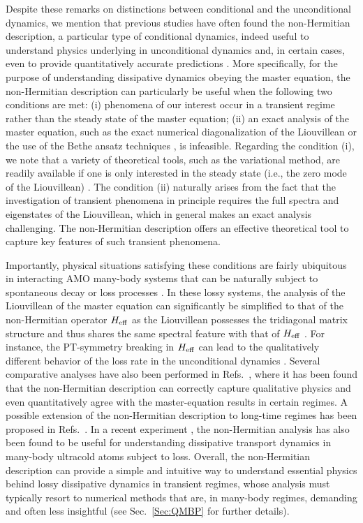 \documentclass{tADP2e}
\theoremstyle{plain}
\theoremstyle{plain}
\theoremstyle{definition}
\begin{document}
Despite these remarks on distinctions between conditional and the unconditional dynamics, we mention that previous studies have often found the non-Hermitian description, a particular type of conditional dynamics, indeed useful to understand physics underlying in unconditional dynamics and, in certain cases, even to provide quantitatively accurate predictions \cite{DAJ09,DAJ14,KW16,LM19,LC19,LDA19}. 
More specifically, for the purpose of understanding dissipative dynamics obeying the master equation, the non-Hermitian description can particularly be useful when the following two conditions are met: (i) phenomena of our interest occur in a transient regime rather than the steady state of the master equation;
(ii) an exact analysis of the master equation, such as the exact numerical diagonalization of the Liouvillean or the use of the Bethe ansatz techniques \cite{Prosen_2015}, is infeasible. 
Regarding the condition (i), we note that a variety of theoretical tools, such as the variational method, are readily available if one is only interested in the steady state (i.e., the zero mode of the Liouvillean)  \cite{WH19}. The condition (ii) naturally arises from the fact that the investigation of transient phenomena in principle requires the full spectra and eigenstates of the Liouvillean, which in general makes an exact analysis  challenging. The non-Hermitian description offers an effective theoretical tool to capture key features of such transient phenomena.

Importantly, physical situations satisfying these conditions are fairly ubiquitous in interacting AMO many-body systems that can be naturally subject to spontaneous decay or loss processes \cite{NS08,RMS09,YB13,ZB14,EU15,PYS15,TT17}. In these lossy systems, the analysis of the Liouvillean of the master equation can significantly be simplified to that of the non-Hermitian operator $H_{\rm eff}$ as the Liouvillean possesses the tridiagonal matrix structure and thus shares the same spectral feature with that of $H_{\rm eff}$ \cite{BHJ93,TJM14}. For instance, the PT-symmetry breaking in $H_{\rm eff}$ can lead to the qualitatively different behavior of the loss rate in the unconditional dynamics \cite{YT20}.   Several comparative analyses have also been performed in Refs.~\cite{Faisal_1981,Graefe_2010,KGZ14,ABJ20,CCL20}, where it has been found that the non-Hermitian description can correctly capture qualitative physics and even quantitatively agree  with the master-equation results in certain regimes. A possible extension of the non-Hermitian description to long-time regimes has been proposed in Refs.~\cite{EA18,Varguet_2019,CCL20}.
In a recent experiment \cite{LM19,CL19}, the non-Hermitian analysis has also been found to be useful for understanding dissipative transport dynamics in many-body ultracold atoms subject to loss. Overall, the non-Hermitian description can provide a simple and intuitive way to understand essential physics behind lossy dissipative dynamics in transient regimes, whose analysis must typically resort to numerical methods that are, in many-body regimes, demanding and often less insightful (see Sec.~\ref{Sec:QMBP} for further details). 
\end{document}
